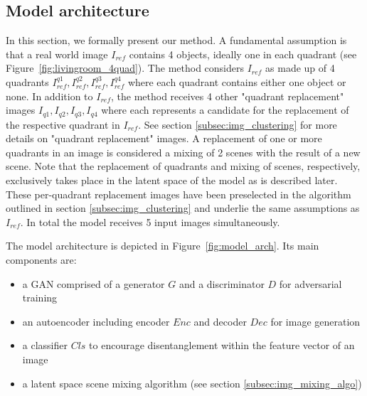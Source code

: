 \documentclass[12pt,a4paper]{article}
\begin{document}
\subsection{Model architecture}\label{subsec:model_arch}
In this section, we formally present our method. A fundamental assumption is that a real world image $I_{ref}$ contains 4 objects, ideally one in each quadrant (see Figure~\ref{fig:livingroom_4quad}). The method considers $I_{ref}$ as made up of 4 quadrants $I^{q1}_{ref}, I^{q2}_{ref}, I^{q3}_{ref}, I^{q4}_{ref}$ where each quadrant contains either one object or none. In addition to $I_{ref}$, the method receives 4 other "quadrant replacement" images $I_{q1},I_{q2},I_{q3},I_{q4}$ where each represents a candidate for the replacement of the respective quadrant in $I_{ref}$. See section \ref{subsec:img_clustering} for more details on "quadrant replacement" images. A replacement of one or more quadrants in an image is considered a mixing of 2 scenes with the result of a new scene. Note that the replacement of quadrants and mixing of scenes, respectively, exclusively takes place in the latent space of the model as is described later. These per-quadrant replacement images have been preselected in the algorithm outlined in section \ref{subsec:img_clustering} and underlie the same assumptions as $I_{ref}$. In total the model receives 5 input images simultaneously.

The model architecture is depicted in Figure~\ref{fig:model_arch}. Its main components are:

\begin{itemize}
   \item a GAN comprised of a generator $G$ and a discriminator $D$ for adversarial training
   \item an autoencoder including encoder $Enc$ and decoder $Dec$ for image generation
   \item a classifier $Cls$ to encourage disentanglement within the feature vector of an image
   \item a latent space scene mixing algorithm (see section \ref{subsec:img_mixing_algo})
\end{itemize}
 
\end{document}
